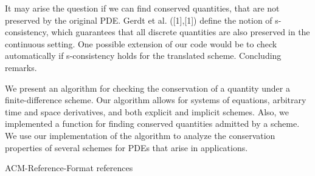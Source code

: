 \documentclass{article}
\begin{document}
It may arise the question if we can find conserved quantities, that are not preserved by the original PDE. Gerdt et al. ([1],[1]) define the notion of s-consistency, which guarantees that all discrete quantities are also preserved in the continuous setting. One possible extension of our code would be to check automatically if s-consistency holds for the translated scheme.
Concluding remarks.


We present an algorithm for checking the conservation of a quantity under a finite-difference scheme. Our algorithm allows for systems of equations, arbitrary time and space derivatives, and both explicit and implicit schemes. Also, we implemented a function for finding conserved quantities admitted by a scheme. We use our implementation of the algorithm to analyze the conservation properties of several schemes for PDEs that arise in applications.

{ACM-Reference-Format}
{references}
\end{document}
